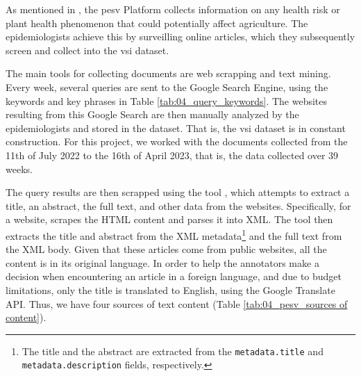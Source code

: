 \label{vsi_dataset}

As mentioned in \headerName{} , the \gls{pesv} Platform collects information on any health risk or plant health phenomenon that could potentially affect agriculture. The epidemiologists achieve this by surveilling online articles, which they subsequently screen and collect into the \gls{vsi} dataset.

\label{vsi_data_collection}


The main tools for collecting documents are web scrapping and text mining. Every week, several queries are sent to the Google Search Engine, using the keywords and key phrases in Table \ref{tab:04_query_keywords}. 
The websites resulting from this Google Search are then manually analyzed by the epidemiologists and stored in the dataset. That is, the \gls{vsi} dataset is in constant construction. 
For this project, we worked with the documents collected from the 11th of July 2022 to the 16th of April 2023, that is, the data collected over 39 weeks.





The query results are then scrapped using the tool \trafilatura{} , which attempts to extract a title, an abstract, the full text, and other data from the websites.
Specifically, for a website, \trafilatura{} scrapes the HTML content and parses it into XML. The tool then extracts the title and abstract from the XML metadata\footnote{The title and the abstract are extracted from the \texttt{metadata.title} and \texttt{metadata.description} fields, respectively.} and the full text from the XML body.
Given that these articles come from public websites, all the content is in its original language.
In order to help the annotators make a decision when encountering an article in a foreign language, and due to budget limitations, only the title is translated to English, using the Google Translate API. Thus, we have four sources of text content (Table \ref{tab:04_pesv_sources of content}).





\label{vsi_data_annotation}

